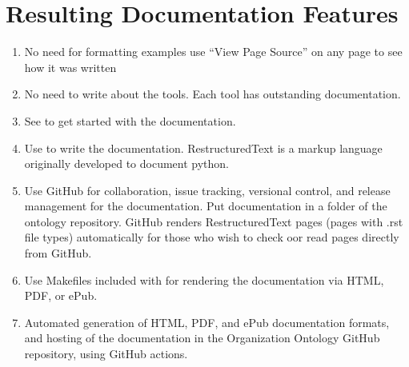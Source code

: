 \documentclass[letterpaper,10pt,english]{sphinxmanual}
\begin{document}
\section{Resulting Documentation Features}
\label{\detokenize{documentation-authors:resulting-documentation-features}}\begin{enumerate}
%
\item {} 
\sphinxAtStartPar
No need for formatting examples \textendash{} use “View Page Source” on any page to see how it
was written

\item {} 
\sphinxAtStartPar
No need to write about the tools.  Each tool has outstanding documentation.

\item {} 
\sphinxAtStartPar
See
to get
started with the documentation.

\item {} 
\sphinxAtStartPar
Use  to
write the documentation.  RestructuredText is a mark\sphinxhyphen{}up language originally developed
to document python.

\item {} 
\sphinxAtStartPar
Use GitHub for collaboration, issue tracking, versional control, and release
management for
the documentation.  Put documentation in a  folder of
the ontology repository.  GitHub renders RestructuredText pages (pages with .rst
file types) automatically for those who wish to check oor read pages directly from
GitHub.

\item {} 
\sphinxAtStartPar
Use Makefiles included with  for rendering
the documentation via HTML, PDF, or ePub.

\item {} 
\sphinxAtStartPar
Automated generation of HTML, PDF, and ePub documentation formats, and hosting of
the documentation in the Organization Ontology GitHub repository, using GitHub
actions.

\end{enumerate}
\end{document}
